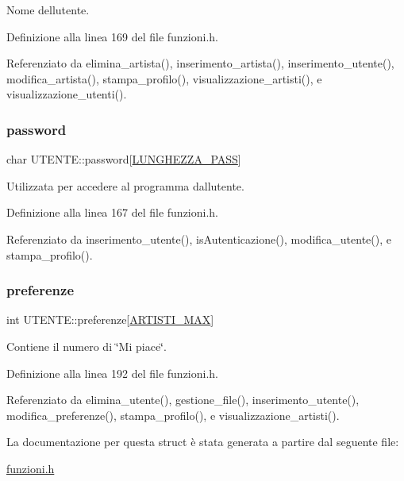 Nome dell\textquotesingle{}utente. 

Definizione alla linea 169 del file funzioni.\+h.



Referenziato da elimina\+\_\+artista(), inserimento\+\_\+artista(), inserimento\+\_\+utente(), modifica\+\_\+artista(), stampa\+\_\+profilo(), visualizzazione\+\_\+artisti(), e visualizzazione\+\_\+utenti().

\mbox{\label{struct_u_t_e_n_t_e_a04d8337f5e0fe9cd44d36cbe7dac7415}} 
\subsubsection{\texorpdfstring{password}{password}}
{\footnotesize\ttfamily char U\+T\+E\+N\+T\+E\+::password\mbox{[}\hyperlink{funzioni_8h_a21981b6e8c0f57093d564c3df476f9ee}{L\+U\+N\+G\+H\+E\+Z\+Z\+A\+\_\+\+P\+A\+SS}\mbox{]}}

Utilizzata per accedere al programma dall\textquotesingle{}utente. 

Definizione alla linea 167 del file funzioni.\+h.



Referenziato da inserimento\+\_\+utente(), is\+Autenticazione(), modifica\+\_\+utente(), e stampa\+\_\+profilo().

\mbox{\label{struct_u_t_e_n_t_e_a1b4dec4c7ed79c12a76501b634b71176}} 
\subsubsection{\texorpdfstring{preferenze}{preferenze}}
{\footnotesize\ttfamily int U\+T\+E\+N\+T\+E\+::preferenze\mbox{[}\hyperlink{funzioni_8h_af17e5297d3cc4c2db33d467698a1b9c2}{A\+R\+T\+I\+S\+T\+I\+\_\+\+M\+AX}\mbox{]}}

Contiene il numero di \char`\"{}\+Mi piace\char`\"{}. 

Definizione alla linea 192 del file funzioni.\+h.



Referenziato da elimina\+\_\+utente(), gestione\+\_\+file(), inserimento\+\_\+utente(), modifica\+\_\+preferenze(), stampa\+\_\+profilo(), e visualizzazione\+\_\+artisti().



La documentazione per questa struct è stata generata a partire dal seguente file\+:\begin{DoxyCompactItemize}
\item 
\hyperlink{funzioni_8h}{funzioni.\+h}\end{DoxyCompactItemize}
